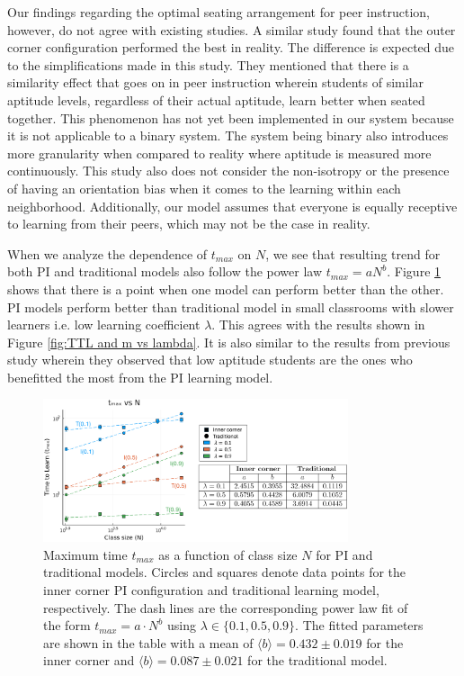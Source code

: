 \documentclass[10pt,a4paper,twoside]{article}
\begin{document}
Our findings regarding the optimal seating arrangement for peer instruction, however, do not agree with existing studies. A similar study \cite{roxas2010seating} found that the outer corner configuration performed the best in reality. The difference is expected due to the simplifications made in this study. They mentioned that there is a similarity effect that goes on in peer instruction wherein students of similar aptitude levels, regardless of their actual aptitude, learn better when seated together. This phenomenon has not yet been implemented in our system because it is not applicable to a binary system. The system being binary also introduces more granularity when compared to reality where aptitude is measured more continuously. This study also does not consider the non-isotropy or the presence of having an orientation bias when it comes to the learning within each neighborhood. Additionally, our model assumes that everyone is equally receptive to learning from their peers, which may not be the case in reality.

When we analyze the dependence of $t_{max}$ on $N$, we see that resulting trend for both PI and traditional models also follow the power law $t_{max}=aN^b$. Figure \ref{fig:tmax vs N} shows that there is a point when one model can perform better than the other. PI models perform better than traditional model in small classrooms with slower learners i.e. low learning coefficient $\lambda$. This agrees with the results shown in Figure \ref{fig:TTL and m vs lambda}. It is also similar to the results from previous study \cite{roxas2010seating} wherein they observed that low aptitude students are the ones who benefitted the most from the PI learning model.

\begin{figure}[h]
  \centering
  \includegraphics[width=0.8\textwidth]{figures/picture3}
  \caption{Maximum time $t_{max}$ as a function of class size $N$ for PI and traditional models. Circles and squares denote data points for the inner corner PI configuration and traditional learning model, respectively. The dash lines are the corresponding power law fit of the form $t_{max}=a \cdot N^b$ using $\lambda \in \lbrace 0.1, 0.5, 0.9 \rbrace$. The fitted parameters are shown in the table with a mean of $\langle b \rangle = 0.432 \pm 0.019$ for the inner corner and $\langle b \rangle = 0.087\pm0.021$ for the traditional model.
  }
  \label{fig:tmax vs N}
\end{figure}
\end{document}
